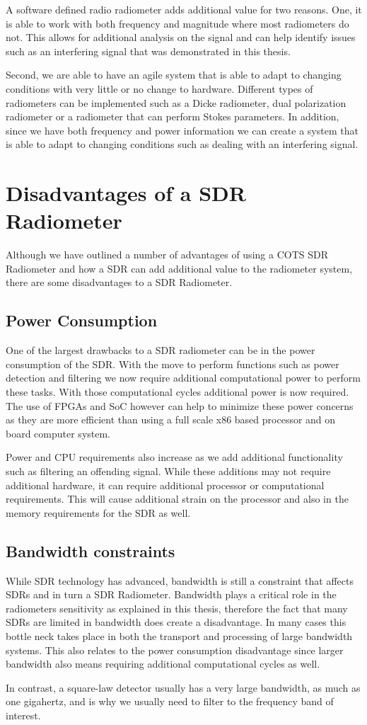 A software defined radio radiometer adds additional value for two reasons.  One, it is able to work with both frequency and magnitude where most radiometers do not.  This allows for additional analysis on the signal and can help identify issues such as an interfering signal that was demonstrated in this thesis.  

Second, we are able to have an agile system that is able to adapt to changing conditions with very little or no change to hardware.  Different types of radiometers can be implemented such as a Dicke radiometer, dual polarization radiometer or a radiometer that can perform Stokes parameters.  In addition, since we have both frequency and power information we can create a system that is able to adapt to changing conditions such as dealing with an interfering signal.  

\section{Disadvantages of a SDR Radiometer}
Although we have outlined a number of advantages of using a COTS SDR Radiometer and how a SDR can add additional value to the radiometer system, there are some disadvantages to a SDR Radiometer.

\subsection{Power Consumption}
One of the largest drawbacks to a SDR radiometer can be in the power consumption of the SDR.  With the move to perform functions such as power detection and filtering we now require additional computational power to perform these tasks.  With those computational cycles additional power is now required.  The use of FPGAs and SoC however can help to minimize these power concerns as they are more efficient than using a full scale x86 based processor and on board computer system.  

Power and CPU requirements also increase as we add additional functionality such as filtering an offending signal.  While these additions may not require additional hardware, it can require additional processor or computational requirements.  This will cause additional strain on the processor and also in the memory requirements for the SDR as well.

\subsection{Bandwidth constraints}
While SDR technology has advanced, bandwidth is still a constraint that affects SDRs and in turn a SDR Radiometer.  Bandwidth plays a critical role in the radiometers sensitivity as explained in this thesis, therefore the fact that many SDRs are limited in bandwidth does create a disadvantage.  In many cases this bottle neck takes place in both the transport and processing of large bandwidth systems.  This also relates to the power consumption disadvantage since larger bandwidth also means requiring additional computational cycles as well.  

In contrast, a square-law detector usually has a very large bandwidth, as much as one gigahertz, and is why we usually need to filter to the frequency band of interest.  
